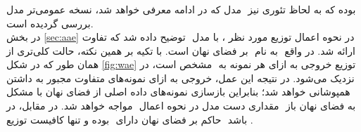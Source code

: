 \subsubsection{\wae} \label{chap2:wae}
مدل \wae{} که در ادامه معرفی خواهد شد، نسخه عمومی‌تر مدل \aae{}‎ بوده که به لحاظ تئوری نیز بررسی گردیده است.\\
در بخش ‎\ref{sec:aae}‎ توضیح داده شد که تفاوت ‎\aae{}‎ با مدل ‎\vae{}‎، در نحوه اعمال توزیع مورد نظر بر فضای نهان است. با تکیه بر همین نکته، حالت کلی‌تری از ‎\aae{}‎ به نام ‎\wae{}‎ ارائه شد. در واقع همان طور که در شکل ‎‎\ref{fig:wae}‎ مشخص است، در ‎\vae{}‎ توزیع خروجی \encoder{} به ازای هر نمونه به ‎\priordist{}‎ نزدیک می‌شود. در نتیجه این عمل، خروجی \encoder{} به ازای نمونه‌های متفاوت مجبور به داشتن همپوشانی خواهد شد؛ بنابراین بازسازی نمونه‌های داده اصلی از فضای نهان با مشکل مواجه خواهد شد. در مقابل، در ‎\wae{}‎ مقداری دست مدل در نحوه اعمال ‎‎\priordist{}‎ به فضای نهان باز بوده و تنها کافیست توزیع ‎\marginal{}‎ حاکم بر فضای نهان دارای ‎\priordist{}‎ باشد \cite{wae}.\\
